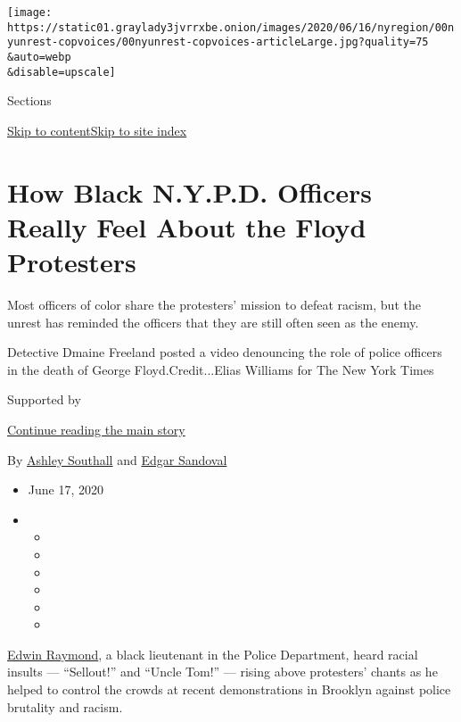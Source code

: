 \texttt{[image: https://static01.graylady3jvrrxbe.onion/images/2020/06/16/nyregion/00nyunrest-copvoices/00nyunrest-copvoices-articleLarge.jpg?quality=75\\\&auto=webp\\\&disable=upscale]}

Sections

\protect\hyperlink{site-content}{Skip to
content}\protect\hyperlink{site-index}{Skip to site index}

\hypertarget{how-black-nypd-officers-really-feel-about-the-floyd-protesters}{%
\section{How Black N.Y.P.D. Officers Really Feel About the Floyd
Protesters}\label{how-black-nypd-officers-really-feel-about-the-floyd-protesters}}

Most officers of color share the protesters' mission to defeat racism,
but the unrest has reminded the officers that they are still often seen
as the enemy.

Detective Dmaine Freeland posted a video denouncing the role of police
officers in the death of George Floyd.Credit...Elias Williams for The
New York Times

Supported by

\protect\hyperlink{after-sponsor}{Continue reading the main story}

By \href{https://www.nytimes3xbfgragh.onion/by/ashley-southall}{Ashley
Southall} and
\href{https://www.nytimes3xbfgragh.onion/by/edgar-sandoval}{Edgar
Sandoval}

\begin{itemize}
\item
  June 17, 2020
\item
  \begin{itemize}
  \item
  \item
  \item
  \item
  \item
  \item
  \end{itemize}
\end{itemize}

\href{https://www.nytimes3xbfgragh.onion/2016/02/21/magazine/a-black-police-officers-fight-against-the-nypd.html}{Edwin
Raymond}, a black lieutenant in the Police Department, heard racial
insults --- ``Sellout!'' and ``Uncle Tom!'' --- rising above protesters'
chants as he helped to control the crowds at recent demonstrations in
Brooklyn against police brutality and racism.

